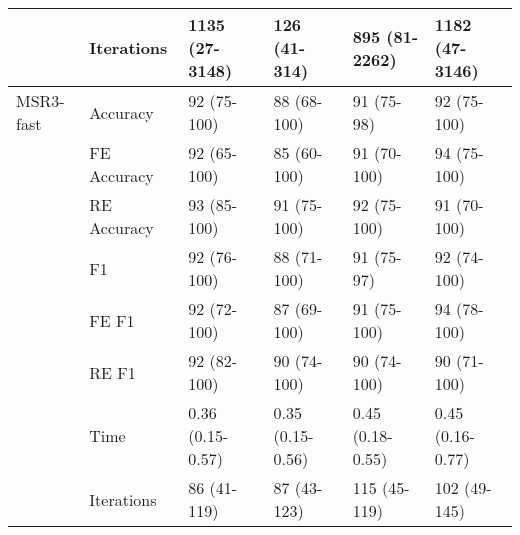 \begin{tabular}{llllll}
          & Iterations &        1135 (27-3148) &         126 (41-314) &        895 (81-2262) &        1182 (47-3146) \\
\hline
MSR3-fast & Accuracy &           92 (75-100) &          88 (68-100) &           91 (75-98) &           92 (75-100) \\
          & FE Accuracy &           92 (65-100) &          85 (60-100) &          91 (70-100) &           94 (75-100) \\
          & RE Accuracy &           93 (85-100) &          91 (75-100) &          92 (75-100) &           91 (70-100) \\
          & F1 &           92 (76-100) &          88 (71-100) &           91 (75-97) &           92 (74-100) \\
          & FE F1 &           92 (72-100) &          87 (69-100) &          91 (75-100) &           94 (78-100) \\
          & RE F1 &           92 (82-100) &          90 (74-100) &          90 (74-100) &           90 (71-100) \\
          & Time &      0.36 (0.15-0.57) &     0.35 (0.15-0.56) &     0.45 (0.18-0.55) &      0.45 (0.16-0.77) \\
          & Iterations &           86 (41-119) &          87 (43-123) &         115 (45-119) &          102 (49-145) \\
\bottomrule
\end{tabular}

